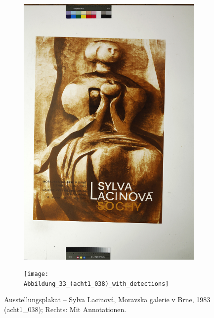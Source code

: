 \documentclass[a4paper,12pt,ngerman]{article}
\begin{document}
\newpage
\begin{landscape}
\begin{figure}[ht]
	\begin{subfigure}[b]{0.5\linewidth}
	\centering
	\includegraphics[height=\linewidth]{Abbildung_37_(acht1_038)}
	\end{subfigure}
	\begin{subfigure}[b]{0.5\linewidth}
	\centering
	\texttt{[image: Abbildung\_33\_(acht1\_038)\_with\_detections]}
	\end{subfigure}
	\caption{Ausstellungsplakat – Sylva Lacinová, Moravska galerie v Brne, 1983 (acht1\_038); Rechts: Mit Annotationen.}
\end{figure}
\end{landscape}
\end{document}
